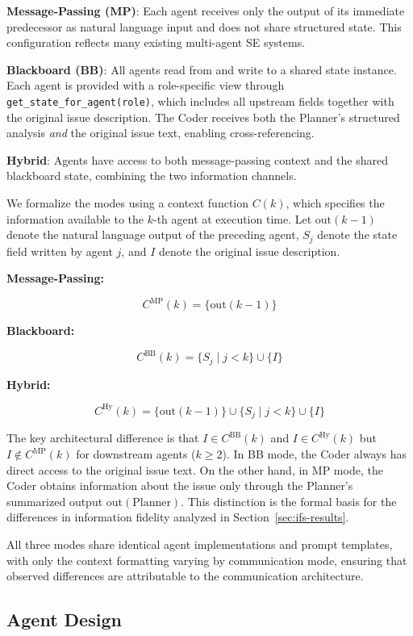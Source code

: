 \documentclass{ieeeaccess}
\begin{document}
\textbf{Message-Passing (MP)}: Each agent receives only the output of its immediate predecessor as natural language input and does not share structured state. This configuration reflects many existing multi-agent SE systems.

\textbf{Blackboard (BB)}: All agents read from and write to a shared state instance. Each agent is provided with a role-specific view through \texttt{get\_state\_for\_agent(role)}, which includes all upstream fields together with the original issue description. The Coder receives both the Planner's structured analysis \emph{and} the original issue text, enabling cross-referencing.

\textbf{Hybrid}: Agents have access to both message-passing context and the shared blackboard state, combining the two information channels.

We formalize the modes using a context function $C(k)$, which specifies the information available to the $k$-th agent at execution time. Let $\text{out}(k{-}1)$ denote the natural language output of the preceding agent, $S_j$ denote the state field written by agent $j$, and $I$ denote the original issue description.

\textbf{Message-Passing:}

\[C^{\text{MP}}(k) = \{\text{out}(k{-}1)\}\]

\textbf{Blackboard:}

\[C^{\text{BB}}(k) = \{S_j \mid j < k\} \cup \{I\}\]

\textbf{Hybrid:}

\[C^{\text{Hy}}(k) = \{\text{out}(k{-}1)\} \cup \{S_j \mid j < k\} \cup \{I\}\]

The key architectural difference is that $I \in C^{\text{BB}}(k)$ and $I \in C^{\text{Hy}}(k)$ but $I \notin C^{\text{MP}}(k)$ for downstream agents ($k \geq 2$). In BB mode, the Coder always has direct access to the original issue text. On the other hand, in MP mode, the Coder obtains information about the issue only through the Planner's summarized output $\text{out}(\text{Planner})$. This distinction is the formal basis for the differences in information fidelity analyzed in Section~\ref{sec:ifs-results}.

All three modes share identical agent implementations and prompt templates, with only the context formatting varying by communication mode, ensuring that observed differences are attributable to the communication architecture.

\subsection{Agent Design}
\end{document}
